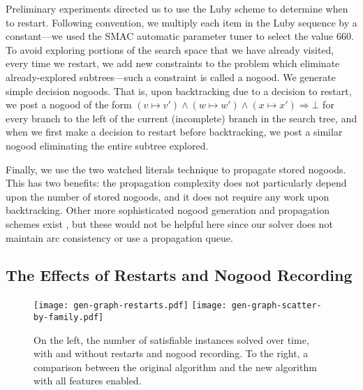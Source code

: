 \documentclass[runningheads]{llncs}
\newcommand{\siplineref}[1]{line~\ref{line:sip:#1}}
\begin{document}
Preliminary experiments directed us to use the Luby scheme \cite{DBLP:journals/ipl/LubySZ93} to
determine when to restart.
Following convention, we multiply each item in the Luby sequence by a constant---we used the SMAC
automatic parameter tuner \cite{DBLP:conf/lion/HutterHL11} to select the value 660.
To avoid exploring portions of the search
space that we have already visited, every time we restart, we add new constraints to the problem
which eliminate already-explored subtrees---such a constraint is called a nogood. We generate
simple decision nogoods. That is, upon backtracking due to a decision to restart, we post a nogood
of the form $(v \mapsto v') \wedge (w \mapsto w') \wedge (x \mapsto x') \Rightarrow \bot$ for every
branch to the left of the current (incomplete) branch in the search tree, and when we first make a
decision to restart before backtracking, we post a similar nogood eliminating the entire subtree
explored.

Finally, we use the two watched literals technique \cite{DBLP:conf/dac/MoskewiczMZZM01} to
propagate stored nogoods.
This has two benefits: the propagation complexity does not particularly depend upon the number of
stored nogoods, and it does not require any work upon backtracking.  Other more sophisticated nogood
generation and propagation schemes exist \cite{DBLP:conf/aaai/LeeSZ16,DBLP:conf/cp/GlorianBLLM17},
but these would not be helpful here since our solver does not maintain arc consistency or use a
propagation queue.

\subsection{The Effects of Restarts and Nogood Recording}

\begin{figure}[tb]
    \texttt{[image: gen-graph-restarts.pdf]}
    \hfill
    \texttt{[image: gen-graph-scatter-by-family.pdf]}

    \caption{On the left, the number of satisfiable instances solved over time, with and without
    restarts and nogood recording. To the right, a comparison between the original algorithm and the
    new algorithm with all features enabled.}
    \label{figure:old-vs-new}
\end{figure}
\end{document}
